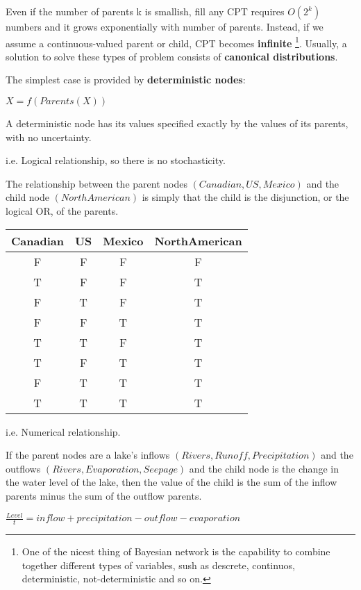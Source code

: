 Even if the number of parents k is smallish, fill any CPT requires $O(2^k)$ numbers and it grows exponentially with number of parents. Instead, if we assume a 
continuous-valued parent or child, CPT becomes \textbf{infinite} \footnote{One of the nicest thing of Bayesian network is the capability to combine together
different types of variables, sush as descrete, continuos, deterministic, not-deterministic and so on.}. Usually, a solution to solve these types of
problem consists of \textbf{canonical distributions}. \vspace{3.5pt}

The simplest case is provided by \textbf{deterministic nodes}:
\begin{center}
    $X = f(Parents(X))$
\end{center}
A deterministic node has its values specified exactly by the values of its parents, with no uncertainty.
\begin{example}
    i.e. Logical relationship, so there is no stochasticity. \vspace{3.5pt}

    The relationship between the parent nodes $(Canadian, US, Mexico)$ and the child node $(NorthAmerican)$ is simply that the child is the disjunction, or the logical OR,
    of the parents. \vspace{3.5pt}

    \begin{center}
        \begin{tabular}{|c|c|c|c|}
            \hline
            \bf Canadian & \bf US & \bf Mexico & \bf NorthAmerican  \\
            \hline
            F & F & F & F \\
            T & F & F & T \\
            F & T & F & T \\
            F & F & T & T \\
            T & T & F & T \\
            T & F & T & T \\
            F & T & T & T \\
            T & T & T & T \\
            \hline
        \end{tabular}
    \end{center} \vspace{7pt}

    i.e. Numerical relationship. \vspace{3.5pt}
    
    If the parent nodes are a lake's inflows $(Rivers, Runoff, Precipitation)$ and the outflows $(Rivers, Evaporation, Seepage)$ and the child node is the
    change in the water level of the lake, then the value of the child is the sum of the inflow parents minus the sum of the outflow parents. \vspace{3.5pt}

    \begin{center}
        $\frac{Level}{t}=inflow+precipitation-outflow-evaporation$
    \end{center}
\end{example}

